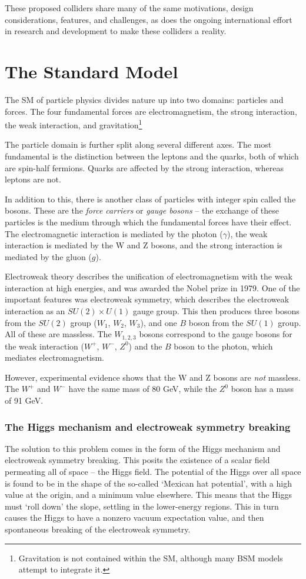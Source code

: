 These proposed colliders share many of the same motivations, design considerations, features, and challenges, as does the ongoing international effort in research and development to make these colliders a reality.

\section{The Standard Model}
The \acrlong{SM} of particle physics divides nature up into two domains: particles and forces. The four fundamental forces are electromagnetism, the strong interaction, the weak interaction, and gravitation\footnote{Gravitation is not contained within the \acrshort{SM}, although many \acrshort{BSM} models attempt to integrate it.}

The particle domain is further split along several different axes. The most fundamental is the distinction between the leptons and the quarks, both of which are spin-half fermions. Quarks are affected by the strong interaction, whereas leptons are not. 

In addition to this, there is another class of particles with integer spin called the bosons. These are the \textit{force carriers} or \textit{gauge bosons} -- the exchange of these particles is the medium through which the fundamental forces have their effect. The electromagnetic interaction is mediated by the photon ($\gamma$), the weak interaction is mediated by the W and Z bosons, and the strong interaction is mediated by the gluon ($g$). 

Electroweak theory describes the unification of electromagnetism with the weak interaction at high energies, and was awarded the Nobel prize in 1979. One of the important features was electroweak symmetry, which describes the electroweak interaction as an $SU(2) \times U(1)$ gauge group. This then produces three bosons from the $SU(2)$ group ($W_1$, $W_2$, $W_3$), and one $B$ boson from the $SU(1)$ group. All of these are massless. The $W_{1,2,3}$ bosons correspond to the gauge bosons for the weak interaction ($W^+$, $W^-$, $Z^0$) and the $B$ boson to the photon, which mediates electromagnetism.

However, experimental evidence shows that the W and Z bosons are \textit{not} massless. The $W^+$ and $W^-$ have the same mass of 80 GeV, while the $Z^0$ boson has a mass of 91 GeV.

\subsubsection{The Higgs mechanism and electroweak symmetry breaking}
The solution to this problem comes in the form of the Higgs mechanism and electroweak symmetry breaking. This posits the existence of a scalar field permeating all of space -- the Higgs field. The potential of the Higgs over all space is found to be in the shape of the so-called `Mexican hat potential', with a high value at the origin, and a minimum value elsewhere. This means that the Higgs must `roll down' the slope, settling in the lower-energy regions. This in turn causes the Higgs to have a nonzero vacuum expectation value, and then spontaneous breaking of the electroweak symmetry.

